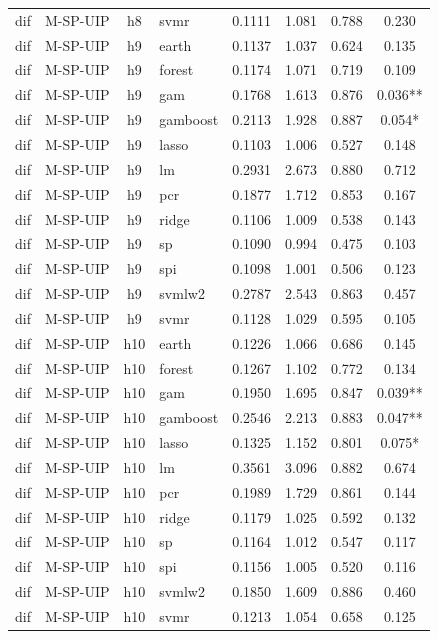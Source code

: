 \begin{ThreePartTable}
\begin{longtable}[t]{llclcccc}
dif & M-SP-UIP & h8 & svmr & 0.1111 & 1.081 & 0.788 & 0.230\\
\addlinespace
dif & M-SP-UIP & h9 & earth & 0.1137 & 1.037 & 0.624 & 0.135\\
dif & M-SP-UIP & h9 & forest & 0.1174 & 1.071 & 0.719 & 0.109\\
dif & M-SP-UIP & h9 & gam & 0.1768 & 1.613 & 0.876 & 0.036**\\
dif & M-SP-UIP & h9 & gamboost & 0.2113 & 1.928 & 0.887 & 0.054*\\
dif & M-SP-UIP & h9 & lasso & 0.1103 & 1.006 & 0.527 & 0.148\\
dif & M-SP-UIP & h9 & lm & 0.2931 & 2.673 & 0.880 & 0.712\\
dif & M-SP-UIP & h9 & pcr & 0.1877 & 1.712 & 0.853 & 0.167\\
dif & M-SP-UIP & h9 & ridge & 0.1106 & 1.009 & 0.538 & 0.143\\
dif & M-SP-UIP & h9 & sp & 0.1090 & 0.994 & 0.475 & 0.103\\
dif & M-SP-UIP & h9 & spi & 0.1098 & 1.001 & 0.506 & 0.123\\
dif & M-SP-UIP & h9 & svmlw2 & 0.2787 & 2.543 & 0.863 & 0.457\\
dif & M-SP-UIP & h9 & svmr & 0.1128 & 1.029 & 0.595 & 0.105\\
\addlinespace
dif & M-SP-UIP & h10 & earth & 0.1226 & 1.066 & 0.686 & 0.145\\
dif & M-SP-UIP & h10 & forest & 0.1267 & 1.102 & 0.772 & 0.134\\
dif & M-SP-UIP & h10 & gam & 0.1950 & 1.695 & 0.847 & 0.039**\\
dif & M-SP-UIP & h10 & gamboost & 0.2546 & 2.213 & 0.883 & 0.047**\\
dif & M-SP-UIP & h10 & lasso & 0.1325 & 1.152 & 0.801 & 0.075*\\
dif & M-SP-UIP & h10 & lm & 0.3561 & 3.096 & 0.882 & 0.674\\
dif & M-SP-UIP & h10 & pcr & 0.1989 & 1.729 & 0.861 & 0.144\\
dif & M-SP-UIP & h10 & ridge & 0.1179 & 1.025 & 0.592 & 0.132\\
dif & M-SP-UIP & h10 & sp & 0.1164 & 1.012 & 0.547 & 0.117\\
dif & M-SP-UIP & h10 & spi & 0.1156 & 1.005 & 0.520 & 0.116\\
dif & M-SP-UIP & h10 & svmlw2 & 0.1850 & 1.609 & 0.886 & 0.460\\
dif & M-SP-UIP & h10 & svmr & 0.1213 & 1.054 & 0.658 & 0.125\\

\end{longtable}
\end{ThreePartTable}
